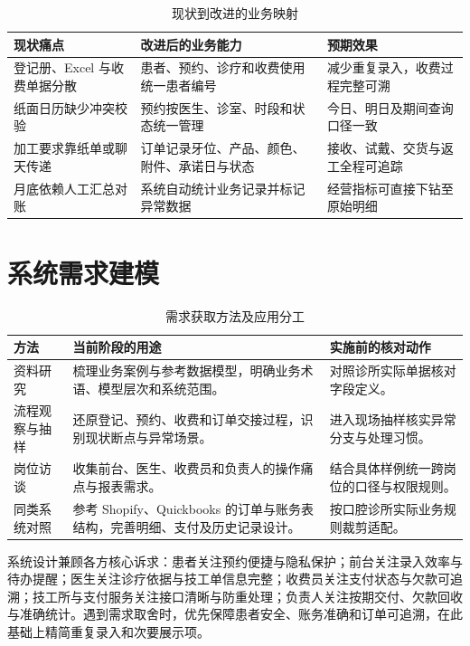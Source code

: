 \documentclass[UTF8,a4paper,12pt,fontset=fandol]{ctexart}
\begin{document}
\begin{table}[H]
\centering
\caption{现状到改进的业务映射}
\begin{tabularx}{\textwidth}{L{3.4cm}L{5.0cm}Y}
\toprule
现状痛点 & 改进后的业务能力 & 预期效果 \\
\midrule
登记册、Excel 与收费单据分散 & 患者、预约、诊疗和收费使用统一患者编号 & 减少重复录入，收费过程完整可溯 \\
纸面日历缺少冲突校验 & 预约按医生、诊室、时段和状态统一管理 & 今日、明日及期间查询口径一致 \\
加工要求靠纸单或聊天传递 & 订单记录牙位、产品、颜色、附件、承诺日与状态 & 接收、试戴、交货与返工全程可追踪 \\
月底依赖人工汇总对账 & 系统自动统计业务记录并标记异常数据 & 经营指标可直接下钻至原始明细 \\
\bottomrule
\end{tabularx}
\end{table}

\section{系统需求建模}
\begin{table}[H]
\centering
\caption{需求获取方法及应用分工}
\begin{tabularx}{\textwidth}{L{2.6cm}L{4.8cm}Y}
\toprule
方法 & 当前阶段的用途 & 实施前的核对动作 \\
\midrule
资料研究 & 梳理业务案例与参考数据模型，明确业务术语、模型层次和系统范围。 & 对照诊所实际单据核对字段定义。 \\
流程观察与抽样 & 还原登记、预约、收费和订单交接过程，识别现状断点与异常场景。 & 进入现场抽样核实异常分支与处理习惯。 \\
岗位访谈 & 收集前台、医生、收费员和负责人的操作痛点与报表需求。 & 结合具体样例统一跨岗位的口径与权限规则。 \\
同类系统对照 & 参考 Shopify、Quickbooks 的订单与账务表结构，完善明细、支付及历史记录设计。 & 按口腔诊所实际业务规则裁剪适配。 \\
\bottomrule
\end{tabularx}
\end{table}

系统设计兼顾各方核心诉求：患者关注预约便捷与隐私保护；前台关注录入效率与待办提醒；医生关注诊疗依据与技工单信息完整；收费员关注支付状态与欠款可追溯；技工所与支付服务关注接口清晰与防重处理；负责人关注按期交付、欠款回收与准确统计。遇到需求取舍时，优先保障患者安全、账务准确和订单可追溯，在此基础上精简重复录入和次要展示项。
\end{document}

